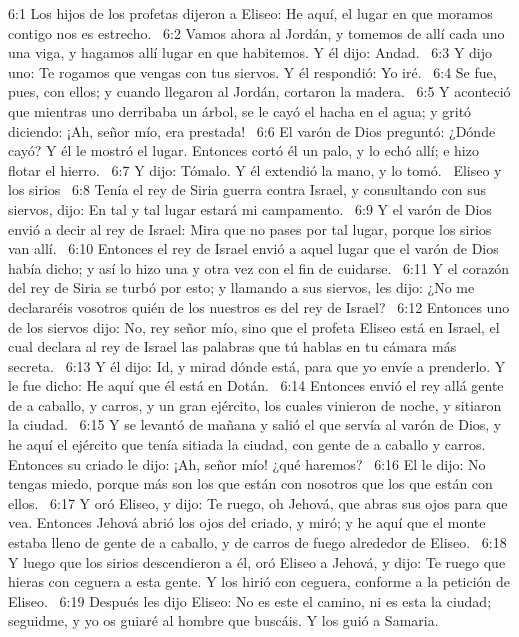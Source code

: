 6:1 Los hijos de los profetas dijeron a Eliseo: He aquí, el lugar en que moramos contigo nos es estrecho.  
6:2 Vamos ahora al Jordán, y tomemos de allí cada uno una viga, y hagamos allí lugar en que habitemos. Y él dijo: Andad.  
6:3 Y dijo uno: Te rogamos que vengas con tus siervos. Y él respondió: Yo iré.  
6:4 Se fue, pues, con ellos; y cuando llegaron al Jordán, cortaron la madera.  
6:5 Y aconteció que mientras uno derribaba un árbol, se le cayó el hacha en el agua; y gritó diciendo: ¡Ah, señor mío, era prestada!  
6:6 El varón de Dios preguntó: ¿Dónde cayó? Y él le mostró el lugar. Entonces cortó él un palo, y lo echó allí; e hizo flotar el hierro.  
6:7 Y dijo: Tómalo. Y él extendió la mano, y lo tomó.  
Eliseo y los sirios  
6:8 Tenía el rey de Siria guerra contra Israel, y consultando con sus siervos, dijo: En tal y tal lugar estará mi campamento.  
6:9 Y el varón de Dios envió a decir al rey de Israel: Mira que no pases por tal lugar, porque los sirios van allí.  
6:10 Entonces el rey de Israel envió a aquel lugar que el varón de Dios había dicho; y así lo hizo una y otra vez con el fin de cuidarse.  
6:11 Y el corazón del rey de Siria se turbó por esto; y llamando a sus siervos, les dijo: ¿No me declararéis vosotros quién de los nuestros es del rey de Israel?  
6:12 Entonces uno de los siervos dijo: No, rey señor mío, sino que el profeta Eliseo está en Israel, el cual declara al rey de Israel las palabras que tú hablas en tu cámara más secreta.  
6:13 Y él dijo: Id, y mirad dónde está, para que yo envíe a prenderlo. Y le fue dicho: He aquí que él está en Dotán.  
6:14 Entonces envió el rey allá gente de a caballo, y carros, y un gran ejército, los cuales vinieron de noche, y sitiaron la ciudad.  
6:15 Y se levantó de mañana y salió el que servía al varón de Dios, y he aquí el ejército que tenía sitiada la ciudad, con gente de a caballo y carros. Entonces su criado le dijo: ¡Ah, señor mío! ¿qué haremos?  
6:16 El le dijo: No tengas miedo, porque más son los que están con nosotros que los que están con ellos.  
6:17 Y oró Eliseo, y dijo: Te ruego, oh Jehová, que abras sus ojos para que vea. Entonces Jehová abrió los ojos del criado, y miró; y he aquí que el monte estaba lleno de gente de a caballo, y de carros de fuego alrededor de Eliseo.  
6:18 Y luego que los sirios descendieron a él, oró Eliseo a Jehová, y dijo: Te ruego que hieras con ceguera a esta gente. Y los hirió con ceguera, conforme a la petición de Eliseo.  
6:19 Después les dijo Eliseo: No es este el camino, ni es esta la ciudad; seguidme, y yo os guiaré al hombre que buscáis. Y los guió a Samaria.  
